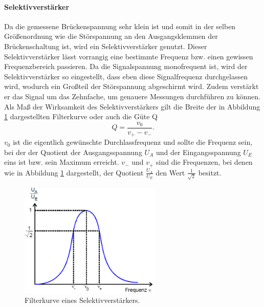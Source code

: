 \paragraph{Selektivverstärker}
Da die gemessene Brückenspannung sehr klein ist und somit in der selben Größenordnung wie die Störspannung an den Ausgangsklemmen der Brückenschaltung ist, 
wird ein Selektivverstärker genutzt. Dieser Selektivverstärker lässt vorrangig eine bestimmte Frequenz bzw. einen  gewissen Frequenzbereich passieren.
Da die Signalspannung monofrequent ist, wird der Selektivverstärker so eingestellt, dass eben diese Signalfrequenz durchgelassen wird, wodurch ein Großteil der 
Störspannung abgeschirmt wird. Zudem verstärkt er das Signal um das Zehnfache, um genauere Messungen durchführen zu können. 
Als Maß der Wirksamkeit des Selektivverstärkers gilt die Breite der in Abbildung \ref{fig:2} dargestellten Filterkurve oder auch die Güte Q
\begin{equation}
    \label{equ:10}
    Q = \frac{v_0}{v_+ - v_-}.
\end{equation}
$v_0$ ist die eigentlich gewünschte Durchlassfrequenz und sollte die Frequenz sein, bei der der Quotient der Ausgangsspannung $U_A$ und der Eingangsspannung $U_E$ 
eins ist bzw. sein Maximum erreicht. $v_-$ und $v_+$ sind die Frequenzen, bei denen wie in Abbildung \ref{fig:2} dargestellt, der Quotient $\frac{U_A}{U_E}$ den Wert $\frac{1}{\sqrt{2}}$ besitzt.
\begin{figure}
    \centering
    \includegraphics[width = 0.60\textwidth]{V606Bild2.png}
    \caption{Filterkurve eines Selektivverstärkers.}
    \label{fig:2}
\end{figure}

